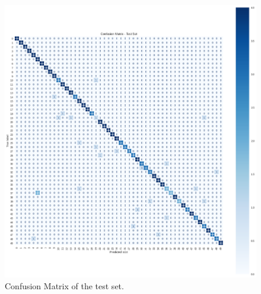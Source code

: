 \documentclass{article}
\begin{document}
\begin{sloppy}
\begin{figure}[ht]
  \centering
  \centerline{\includegraphics[width=\columnwidth]{Confusion_matrix_test.png}}
  \caption{Confusion Matrix of the test set.}
  \label{fig:confusion_matrix_test}
\end{figure}



\end{sloppy}
\end{document}
